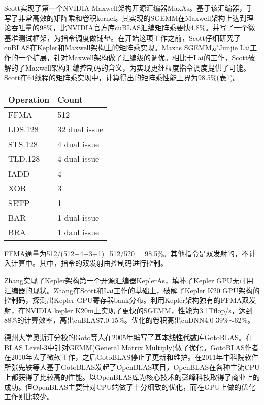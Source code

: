 Scott实现了第一个NVIDIA Maxwell架构开源汇编器MaxAs。基于该汇编器，手写了非常高效的矩阵乘和卷积kernel。其实现的SGEMM在Maxwell架构上达到理论吞吐量的98\%，比NVIDIA官方库cuBLAS汇编矩阵乘要快4.8\%。并写了一个微基准测试框架，为指令调度做铺垫。在开始这项工作之前，Scott仔细研究了cuBLAS在Kepler和Maxwell架构上的矩阵乘实现。Maxas SGEMM是Junjie Lai工作的一个扩展，针对Maxwell架构做了汇编级的调优。相比于Lai的工作，Scott破解的了Maxwell架构汇编控制码的含义，为实现更细粒度指令调度提供了可能。Scott在64线程的矩阵乘实现中，计算得出的矩阵乘性能上界为98.5\%(表\ref{tab:maxwellFFMA})。
\begin{table}[htbp]
	\label{tab:maxwellFFMA}
	\begin{center}
		\begin{tabular}{ | l | p{3cm} |}
			\hline
			Operation & Count \\ \hline
			FFMA & 512  \\ \hline
			LDS.128 & 32 dual issue \\ \hline
			STS.128 & 4 dual issue \\ \hline
			TLD.128 & 4 dual issue \\ \hline
			IADD & 4 \\ \hline
			XOR & 3 \\ \hline
			SETP & 1 \\ \hline
			BAR & 1 dual issue \\ \hline
			BRA & 1 daul issue \\
			\hline
		\end{tabular}
	\end{center}	
\end{table}

FFMA通量为512/(512+4+3+1)=512/520 = 98.5\%。其他指令是双发射的，不计入计算中。其中，指令的双发射由控制码进行控制。

Zhang实现了Kepler架构第一个开源汇编器KeplerAs，填补了Kepler GPU无可用汇编器的现状。Zhang在Scott和Lai工作的基础上，破解了Kepler K20 GPU架构的控制码，探测出Kepler GPU寄存器bank分布。利用Kepler架构独有的FFMA双发射，在NVIDIA kepler K20m上实现了更快的SGEMM，性能为3.1Tflop/s，达到88\%的计算效率，高出cuBLAS7.0 15\%。优化的卷积高出cuDNN4.0 39\%$\sim$62\%。

德州大学奥斯汀分校的Goto等人在2005年编写了基本线性代数库GotoBLAS。在BLAS Level-3中针对GEMM(General Matrix Multiply)做了优化。GotoBLAS作者在2010年去了微软工作，之后GotoBLAS停止了更新和维护。在2011年中科院软件所张先轶等人基于GotoBLAS发起了OpenBLAS项目，OpenBLAS在各种主流CPU上都获得了比较高的性能。以OpenBLAS库为核心技术的彭峰科技取得了商业上的成功。但OpenBLAS主要针对CPU端做了十分细致的优化，而在GPU上做的优化工作则比较少。

